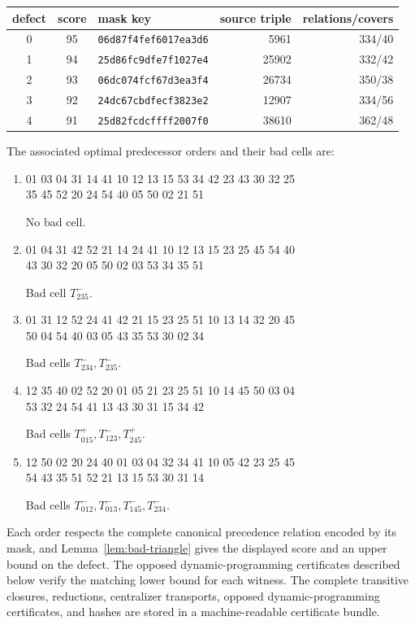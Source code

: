 \documentclass[11pt,a4paper]{article}
\theoremstyle{remark}
\begin{document}
\begin{center}
\small
\begin{tabular}{cclrr}
\toprule
defect & score & mask key & source triple & relations/covers\\
\midrule
0 & 95 & \texttt{06d87f4fef6017ea3d6} & 5961  & 334/40\\
1 & 94 & \texttt{25d86fc9dfe7f1027e4} & 25902 & 332/42\\
2 & 93 & \texttt{06dc074fcf67d3ea3f4} & 26734 & 350/38\\
3 & 92 & \texttt{24dc67cbdfecf3823e2} & 12907 & 334/56\\
4 & 91 & \texttt{25d82fcdcffff2007f0} & 38610 & 362/48\\
\bottomrule
\end{tabular}
\end{center}

The associated optimal predecessor orders and their bad cells are:
\begin{enumerate}[label={\(d=\arabic*:\)},start=0,leftmargin=*]
\item {\ttfamily\footnotesize 01 03 04 31 14 41 10 12 13 15 53 34 42 23 43 30 32 25\\
35 45 52 20 24 54 40 05 50 02 21 51}\par No bad cell.
\item {\ttfamily\footnotesize 01 04 31 42 52 21 14 24 41 10 12 13 15 23 25 45 54 40\\
43 30 32 20 05 50 02 03 53 34 35 51}\par Bad cell \(T^-_{235}\).
\item {\ttfamily\footnotesize 01 31 12 52 24 41 42 21 15 23 25 51 10 13 14 32 20 45\\
50 04 54 40 03 05 43 35 53 30 02 34}\par Bad cells \(T^-_{234},T^-_{235}\).
\item {\ttfamily\footnotesize 12 35 40 02 52 20 01 05 21 23 25 51 10 14 45 50 03 04\\
53 32 24 54 41 13 43 30 31 15 34 42}\par Bad cells
\(T^+_{015},T^-_{123},T^+_{245}\).
\item {\ttfamily\footnotesize 12 50 02 20 24 40 01 03 04 32 34 41 10 05 42 23 25 45\\
54 43 35 51 52 21 13 15 53 30 31 14}\par Bad cells
\(T^-_{012},T^-_{013},T^-_{145},T^-_{234}\).
\end{enumerate}
Each order respects the complete canonical precedence relation encoded by
its mask, and Lemma~\ref{lem:bad-triangle} gives the displayed score and an
upper bound on the defect.  The opposed dynamic-programming certificates
described below verify the matching lower bound for each witness.
The complete transitive closures, reductions, centralizer transports, opposed
dynamic-programming certificates, and hashes are stored in a machine-readable
certificate bundle.
\end{document}
